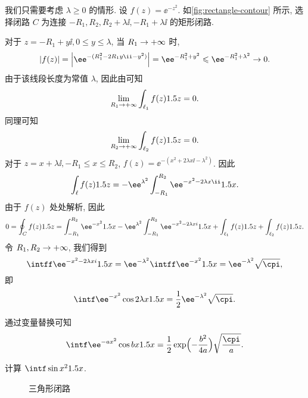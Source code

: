 \begin{solution}
  我们只需要考虑 $\lambda \ge 0$ 的情形.
  设 $f(z)=\ee^{-z^2}$.
  如\ref{fig:rectangle-contour} 所示, 选择闭路 $C$ 为连接 $-R_1,R_2,R_2+\lambda \ii,-R_1+\lambda \ii$ 的矩形闭路.

  对于 $z=-R_1+y\ii,0\le y\le \lambda$, 当 $R_1\rightarrow+\infty$ 时,
  \[
    |f(z)|=\abs{\ee^{-(R_1^2-2R_1y\ii-y^2)}}
    =\ee^{-R_1^2+y^2}\le \ee^{-R_1^2+\lambda^2}\ra0.
  \]
  由于该线段长度为常值 $\lambda$, 因此由\thmGrowUp 可知
  \[
    \lim_{R_1\rightarrow+\infty}\int_{\ell_1}f(z)1.5 z=0.
  \]
  同理可知
  \[
    \lim_{R_2\rightarrow+\infty}\int_{\ell_2}f(z)1.5 z=0.
  \]
  对于 $z=x+\lambda \ii,-R_1\le x\le R_2$, $f(z)=\ee^{-(x^2+2\lambda x\ii-\lambda^2)}$.
  因此
  \[
    \int_\ell f(z)\d z
    =-\ee^{\lambda^2}\int_{-R_1}^{R_2} \ee^{-x^2-2\lambda x\ii}\d x.
  \]
  由于 $f(z)$ 处处解析, 因此
  \[
     0
    =\oint_C f(z)\d z
    =\int_{-R_1}^{R_2} \ee^{-x^2}\d x
    -\ee^{\lambda^2}\int_{-R_1}^{R_2} \ee^{-x^2-2\lambda xi}\d x
    +\int_{\ell_1}f(z)\d z
    +\int_{\ell_2}f(z)\d z.
  \]
  令 $R_1,R_2\rightarrow+\infty$, 我们得到
  \[
    \intff \ee^{-x^2-2\lambda xi}\d x
    =\ee^{-\lambda^2}\intff \ee^{-x^2}\d x
    =\ee^{-\lambda^2}\sqrt\cpi,
  \]
  即
  \[
    \intf \ee^{-x^2}\cos{2\lambda x}\d x
    =\frac12\ee^{-\lambda^2}\sqrt\cpi.
  \]
\end{solution}
通过变量替换可知
\begin{equation}\label{eq:exp-cos-integral}
  \intf \ee^{-ax^2}\cos{bx}\d x
  =\frac12\exp\Bigl(-\frac{b^2}{4a}\Bigr)\sqrt\frac\cpi a.
\end{equation}

\begin{example}
  计算 $\intf\sin x^2\d x$.
\end{example}

\begin{figure}[!htb]
  \centering
  \caption{三角形闭路}
  \label{fig:triangle-contour}
\end{figure}

